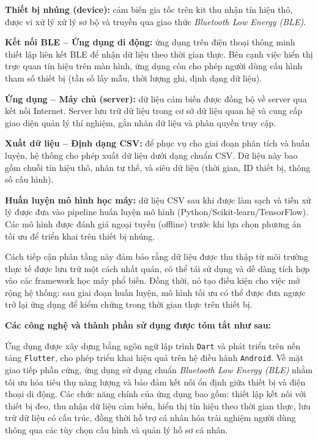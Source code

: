 \textbf{Thiết bị nhúng (device):} cảm biến gia tốc trên kit thu nhận tín hiệu thô, được vi xử lý xử lý sơ bộ và truyền qua giao thức \textit{Bluetooth Low Energy (BLE)}.

\textbf{Kết nối BLE – Ứng dụng di động:} ứng dụng trên điện thoại thông minh thiết lập liên kết BLE để nhận dữ liệu theo thời gian thực. Bên cạnh việc hiển thị trực quan tín hiệu trên màn hình, ứng dụng còn cho phép người dùng cấu hình tham số thiết bị (tần số lấy mẫu, thời lượng ghi, định dạng dữ liệu).

\textbf{Ứng dụng – Máy chủ (server):} dữ liệu cảm biến được đồng bộ về server qua kết nối Internet. Server lưu trữ dữ liệu trong cơ sở dữ liệu quan hệ và cung cấp giao diện quản lý thí nghiệm, gắn nhãn dữ liệu và phân quyền truy cập.

\textbf{Xuất dữ liệu – Định dạng CSV:} để phục vụ cho giai đoạn phân tích và huấn luyện, hệ thống cho phép xuất dữ liệu dưới dạng chuẩn CSV. Dữ liệu này bao gồm chuỗi tín hiệu thô, nhãn tư thế, và siêu dữ liệu (thời gian, ID thiết bị, thông số cấu hình).

\textbf{Huấn luyện mô hình học máy:} dữ liệu CSV sau khi được làm sạch và tiền xử lý được đưa vào pipeline huấn luyện mô hình (Python/Scikit-learn/TensorFlow). Các mô hình được đánh giá ngoại tuyến (offline) trước khi lựa chọn phương án tối ưu để triển khai trên thiết bị nhúng.

Cách tiếp cận phân tầng này đảm bảo rằng dữ liệu được thu thập từ môi trường thực tế được lưu trữ một cách nhất quán, có thể tái sử dụng và dễ dàng tích hợp vào các framework học máy phổ biến. Đồng thời, nó tạo điều kiện cho việc mở rộng hệ thống: sau giai đoạn huấn luyện, mô hình tối ưu có thể được đưa ngược trở lại ứng dụng để kiểm chứng trong thời gian thực trên thiết bị.

\textbf{Các công nghệ và thành phần sử dụng được tóm tắt như sau:}

Ứng dụng được xây dựng bằng ngôn ngữ lập trình \texttt{Dart} và phát triển trên 
nền tảng \texttt{Flutter}, cho phép triển khai hiệu quả trên hệ điều hành 
\texttt{Android}. Về mặt giao tiếp phần cứng, ứng dụng sử dụng chuẩn 
\textit{Bluetooth Low Energy (BLE)} nhằm tối ưu hóa tiêu thụ năng lượng và 
bảo đảm kết nối ổn định giữa thiết bị và điện thoại di động. 
Các chức năng chính của ứng dụng bao gồm: thiết lập kết nối với thiết bị đeo, 
thu nhận dữ liệu cảm biến, hiển thị tín hiệu theo thời gian thực, lưu trữ dữ liệu 
có cấu trúc, đồng thời hỗ trợ cá nhân hóa trải nghiệm người dùng thông qua các 
tùy chọn cấu hình và quản lý hồ sơ cá nhân.

